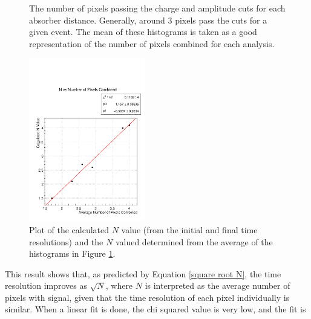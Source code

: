 \documentclass[twocolumn,aps,prd,reprint]{revtex4-1}
\begin{document}
\begin{figure}[!htbp]
\caption{The number of pixels passing the charge and amplitude cuts for each absorber distance. Generally, around 3 pixels pass the cuts for a given event. The mean of these histograms is taken as a good representation of the number of pixels combined for each analysis.}
\label{pixels average}
\end{figure}

\begin{figure}[!htbp]
\centering
\includegraphics[width = 0.45\textwidth]{time_res_n}
\caption{Plot of the calculated $N$ value (from the initial and final time resolutions) and the $N$ valued determined from the average of the histograms in Figure \ref{pixels average}.}
\label{linear fit N}
\end{figure}

This result shows that, as predicted by Equation \ref{square root N}, the time resolution improves as $\sqrt{N}$, where $N$ is interpreted as the average number of pixels with signal, given that the time resolution of each pixel individually is similar. When a linear fit is done, the chi squared value is very low, and the fit is 
\end{document}
